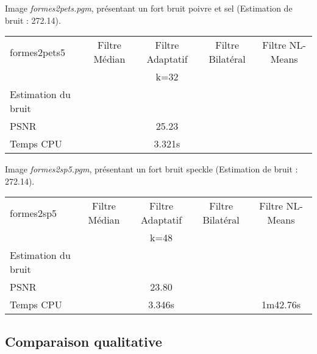 \documentclass[a4,12pt]{article}
\begin{document}
\vspace{2em}

Image \textit{formes2pets.pgm}, présentant un fort bruit poivre et sel (Estimation de bruit : 272.14).

\begin{center}
\begin{tabular}{|l||c|c|c|c|}
\hline
formes2pets5  & Filtre Médian & Filtre Adaptatif & Filtre Bilatéral & Filtre NL-Means\\
& & k=32 & & \\
\hline
Estimation du bruit
&
&
&
&\\
\hline
PSNR
&
& 25.23
&
&\\
\hline
Temps CPU
&
& 3.321s
&
&\\
\hline
\end{tabular} 
\end{center}

\vspace{2em}

Image \textit{formes2sp5.pgm}, présentant un fort bruit speckle (Estimation de bruit : 272.14).

\begin{center}
\begin{tabular}{|l||c|c|c|c|}
\hline
formes2sp5  & Filtre Médian & Filtre Adaptatif & Filtre Bilatéral & Filtre NL-Means \\
& & k=48 & & \\
\hline
Estimation du bruit
&
&
&
&\\
\hline
PSNR
&
& 23.80
&
&\\
\hline
Temps CPU
&
& 3.346s
&
& 1m42.76s\\
\hline
\end{tabular} 
\end{center}

\vspace{2em}

\subsection{Comparaison qualitative}


\end{document}
